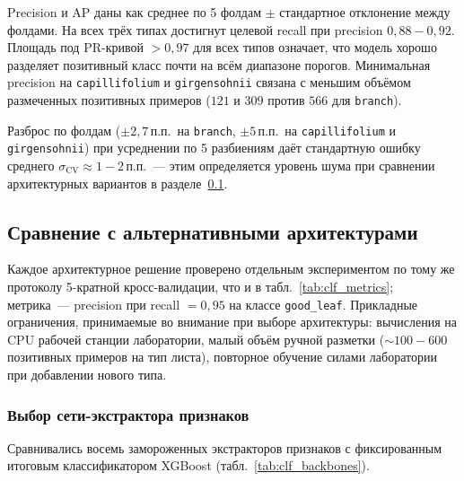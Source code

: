 Precision и AP даны как среднее по 5 фолдам $\pm$ стандартное отклонение
между фолдами. На всех трёх типах достигнут целевой recall при precision
$0{,}88\!-\!0{,}92$. Площадь под PR-кривой $> 0{,}97$ для всех типов
означает, что модель хорошо разделяет позитивный класс почти на всём
диапазоне порогов. Минимальная precision на \texttt{capillifolium} и
\texttt{girgensohnii} связана с меньшим объёмом размеченных позитивных
примеров ($121$ и $309$ против $566$ для \texttt{branch}).

Разброс по фолдам ($\pm 2{,}7$\,п.п.\ на \texttt{branch}, $\pm 5$\,п.п.\
на \texttt{capillifolium} и \texttt{girgensohnii}) при усреднении по 5
разбиениям даёт стандартную ошибку среднего
$\sigma_{\text{CV}} \approx 1\!-\!2$\,п.п.~--- этим определяется уровень
шума при сравнении архитектурных вариантов в
разделе~\ref{sec:classifier_justification}.

\subsection{Сравнение с альтернативными архитектурами}
\label{sec:classifier_justification}

Каждое архитектурное решение проверено отдельным экспериментом по тому же
протоколу 5-кратной кросс-валидации, что и в табл.~\ref{tab:clf_metrics};
метрика~--- precision при recall $= 0{,}95$ на классе \texttt{good\_leaf}. Прикладные ограничения, принимаемые во внимание при
выборе архитектуры: вычисления на CPU рабочей станции лаборатории, малый
объём ручной разметки ($\sim 100\!-\!600$ позитивных примеров на тип листа),
повторное обучение силами лаборатории при добавлении нового типа.

\subsubsection*{Выбор сети-экстрактора признаков}

Сравнивались восемь замороженных экстракторов признаков с фиксированным
итоговым классификатором XGBoost (табл.~\ref{tab:clf_backbones}).

